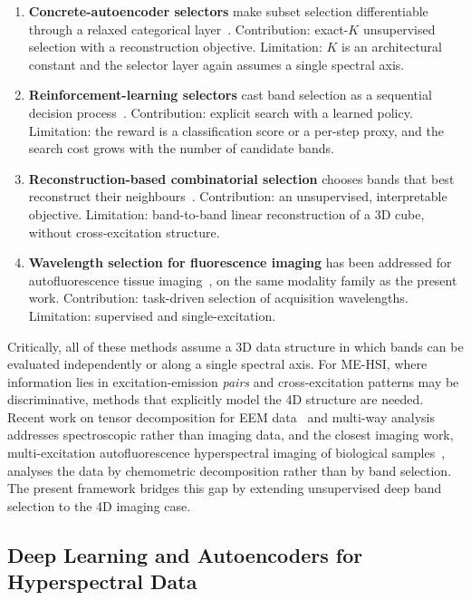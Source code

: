 \begin{enumerate}
\item \textbf{Concrete-autoencoder selectors} make subset selection differentiable through a relaxed categorical layer~\cite{balin2019concrete,sun2022concrete}.
  Contribution: exact-$K$ unsupervised selection with a reconstruction objective.
  Limitation: $K$ is an architectural constant and the selector layer again assumes a single spectral axis.
\item \textbf{Reinforcement-learning selectors} cast band selection as a sequential decision process~\cite{mou2022reinforcement,guo2025twostage}.
  Contribution: explicit search with a learned policy.
  Limitation: the reward is a classification score or a per-step proxy, and the search cost grows with the number of candidate bands.
\item \textbf{Reconstruction-based combinatorial selection} chooses bands that best reconstruct their neighbours~\cite{wang2020onr}.
  Contribution: an unsupervised, interpretable objective.
  Limitation: band-to-band linear reconstruction of a 3D cube, without cross-excitation structure.
\item \textbf{Wavelength selection for fluorescence imaging} has been addressed for autofluorescence tissue imaging~\cite{asfour2018}, on the same modality family as the present work.
  Contribution: task-driven selection of acquisition wavelengths.
  Limitation: supervised and single-excitation.
\end{enumerate}

Critically, all of these methods assume a 3D data structure in which bands can be evaluated independently or along a single spectral axis.
For ME-HSI, where information lies in excitation-emission \emph{pairs} and cross-excitation patterns may be discriminative, methods that explicitly model the 4D structure are needed.
Recent work on tensor decomposition for EEM data~\cite{murphy2013fluorescence} and multi-way analysis~\cite{bro1997parafac} addresses spectroscopic rather than imaging data, and the closest imaging work, multi-excitation autofluorescence hyperspectral imaging of biological samples~\cite{ghaffari2019multiexcitation}, analyses the data by chemometric decomposition rather than by band selection.
The present framework bridges this gap by extending unsupervised deep band selection to the 4D imaging case.

\subsection{Deep Learning and Autoencoders for Hyperspectral Data}
\label{sec:related_dl}

